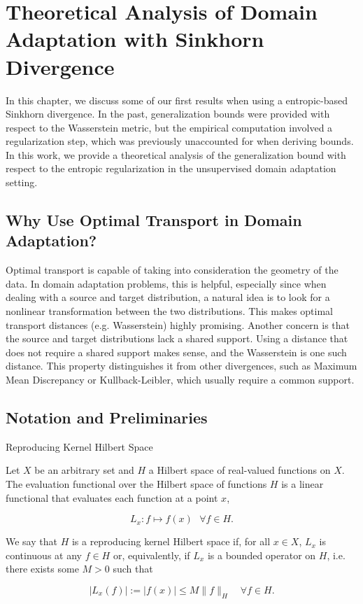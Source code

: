 \chapter{Theoretical Analysis of Domain Adaptation with Sinkhorn Divergence}

In this chapter, we discuss some of our first results when using a entropic-based Sinkhorn divergence. In the past, generalization bounds were provided with respect to the Wasserstein metric, but the empirical computation involved a regularization step, which was previously unaccounted for when deriving bounds. In this work, we provide a theoretical analysis of the generalization bound with respect to the entropic regularization in the unsupervised domain adaptation setting.

\section*{Why Use Optimal Transport in Domain Adaptation?}
Optimal transport is capable of taking into consideration the geometry of the data. In domain adaptation problems, this is helpful, especially since when dealing with a source and target distribution, a natural idea is to look for a nonlinear transformation between the two distributions. This makes optimal transport distances (e.g. Wasserstein) highly promising. Another concern is that the source and target distributions lack a shared support. Using a distance that does not require a shared support makes sense, and the Wasserstein is one such distance. This property distinguishes it from other divergences, such as Maximum Mean Discrepancy or Kullback-Leibler, which usually require a common support.

\section{Notation and Preliminaries}

\begin{definition}{Reproducing Kernel Hilbert Space}
	
	Let $X$ be an arbitrary set and $H$ a Hilbert space of real-valued functions on $X$.  The evaluation functional over the Hilbert space of functions $H$ is a linear functional that evaluates each function at a point $x$,
	
	\[
	L_{x} : f \mapsto f(x)  \text{   } \forall f \in H.
	\]
	
	We say that $H$ is a reproducing kernel Hilbert space if, for all $x \in X$, $L_{x}$ is continuous at any $f\in H$ or, equivalently, if $L_x$ is a bounded operator on $H$, i.e. there exists some $M > 0$ such that
	
	\[
	|L_{x}(f)| := |f(x)| \le M \|f\|_H \quad \forall f \in H.
	\]

\end{definition}


